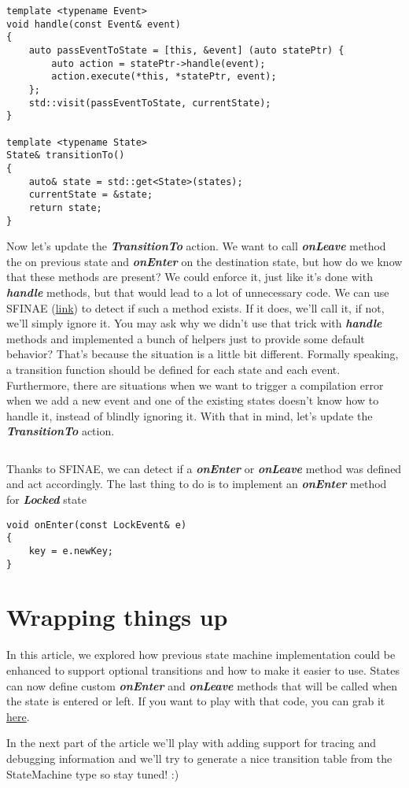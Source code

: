 \documentclass{article}[8pt]
\newcommand{\code}[1]{\textbf{\textit{#1}}}
\newcommand{\locked}{\code{Locked}}
\begin{document}
\bigskip
\begin{verbatim}
template <typename Event>
void handle(const Event& event)
{
	auto passEventToState = [this, &event] (auto statePtr) {
		auto action = statePtr->handle(event);
		action.execute(*this, *statePtr, event);
	};
	std::visit(passEventToState, currentState);
}

template <typename State>
State& transitionTo()
{
	auto& state = std::get<State>(states);
	currentState = &state;
	return state;
}
\end{verbatim}
\bigskip

Now let's update the \code{TransitionTo} action. We want to call \code{onLeave} method the on previous state and \code{onEnter} on the destination state, but how do we know that these methods are present? We could enforce it, just like it's done with \code{handle} methods, but that would lead to a lot of unnecessary code. We can use SFINAE (\href{https://en.cppreference.com/w/cpp/language/sfinae}{link}) to detect if such a method exists. If it does, we'll call it, if not, we'll simply ignore it. You may ask why we didn't use that trick with \code{handle} methods and implemented a bunch of helpers just to provide some default behavior? That's because the situation is a little bit different. Formally speaking, a transition function should be defined for each state and each event. Furthermore, there are situations when we want to trigger a compilation error when we add a new event and one of the existing states doesn't know how to handle it, instead of blindly ignoring it. With that in mind, let's update the \code{TransitionTo} action.

\bigskip
\inputminted[firstline=3]{c++}{../fsm/actions/TransitionTo.h}
\bigskip

Thanks to SFINAE, we can detect if a \code{onEnter} or \code{onLeave} method was defined and act accordingly. The last thing to do is to implement an \code{onEnter} method for \locked{} state

\bigskip
\begin{verbatim}
void onEnter(const LockEvent& e)
{
	key = e.newKey;
}
\end{verbatim}
\bigskip

\section*{Wrapping things up}
In this article, we explored how previous state machine implementation could be enhanced to support optional transitions and how to make it easier to use. States can now define custom \code{onEnter} and \code{onLeave} methods that will be called when the state is entered or left. If you want to play with that code, you can grab it \href{https://github.com/AdamsPL/state-machine}{here}.

In the next part of the article we'll play with adding support for tracing and debugging information and we'll try to generate a nice transition table from the StateMachine type so stay tuned! :)
\end{document}
